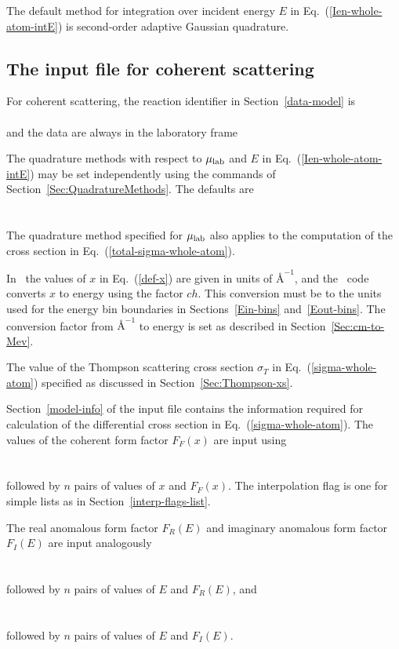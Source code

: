 The default method for integration over incident energy $E$ in
Eq.~(\ref{Ien-whole-atom-intE}) is second-order adaptive Gaussian
quadrature.

\subsection{The input file for coherent scattering}
For coherent scattering, the reaction identifier in Section~\ref{data-model} 
is\\
  \\
and the data are always in the laboratory frame\\

The quadrature methods with respect to $\mu_{\text{lab}}$ and $E$
in Eq.~(\ref{Ien-whole-atom-intE}) may be set independently
using the commands of Section~\ref{Sec:QuadratureMethods}.
The defaults are\\
    \\
    \\
The quadrature method specified for $\mu_{\text{lab}}$ also applies to the computation of
the cross section in Eq.~(\ref{total-sigma-whole-atom}).

In \xendl\ the values of $x$ in Eq.~(\ref{def-x}) are given in units of
$\text{\AA}^{-1}$, and the \gettransfer\ code converts $x$ to energy using
the factor $ch$.  This conversion must be to the units used for the
energy bin boundaries in Sections~\ref{Ein-bins} and~\ref{Eout-bins}.
The conversion factor from $\text{\AA}^{-1}$
to energy is set as described in 
Section~\ref{Sec:cm-to-Mev}.

The value of the Thompson scattering cross section $\sigma_T$ in
Eq.~(\ref{sigma-whole-atom}) specified as discussed in
Section~\ref{Sec:Thompson-xs}.

Section~\ref{model-info} of the input file contains the information required
for calculation of the differential cross section in Eq.~(\ref{sigma-whole-atom}).
The values of the coherent form factor $F_F(x)$ are
input using\\
    \\
    \\
followed by $n$ pairs of values of $x$ and $F_F(x)$.  The interpolation
flag is one for simple lists as in Section~\ref{interp-flags-list}.

The  real anomalous form factor $F_R(E)$ and 
imaginary anomalous form factor $F_I(E)$ are input analogously\\
    \\
    \\
followed by $n$ pairs of values of $E$ and $F_R(E)$, and\\
    \\
    \\
followed by $n$ pairs of values of $E$ and $F_I(E)$.

